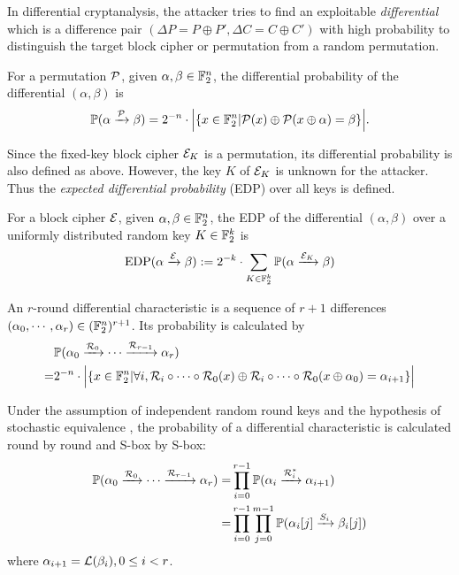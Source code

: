 In differential cryptanalysis, the attacker tries to find an exploitable \textit{differential} which is a difference pair $(\Delta P=P\oplus P',\Delta C=C\oplus C')$ with high probability to distinguish the target block cipher or permutation from a random permutation. 

\begin{definition}
    For a permutation $\mathcal{P}$, given $\alpha,\beta\in \mathbb{F}_2^n$, the differential probability of the differential $(\alpha,\beta)$ is
    \begin{align*}
        \mathbb{P}(\alpha\xrightarrow{\mathcal{P}}\beta)=2^{-n}\cdot\Big|\{x\in\mathbb{F}_2^n|\mathcal{P}(x)\oplus\mathcal{P}(x\oplus\alpha)=\beta\}\Big|.
    \end{align*}
\end{definition}

Since the fixed-key block cipher $\mathcal{E}_K$ is a permutation, its differential probability is also defined as above. However, the key $K$ of $\mathcal{E}_K$ is unknown for the attacker. Thus the \textit{expected differential probability} (EDP) over all keys is defined.

\begin{definition}
    For a block cipher $\mathcal{E}$, given $\alpha,\beta\in \mathbb{F}_2^n$, the EDP of the differential $(\alpha,\beta)$ over a uniformly distributed random key $K\in \mathbb{F}_2^k$ is 
    \begin{align*}
        \text{EDP}(\alpha\xrightarrow{\mathcal{E}}\beta):=2^{-k}\cdot\sum\limits_{K\in \mathbb{F}_2^k}\mathbb{P}(\alpha\xrightarrow{\mathcal{E}_K}\beta)
    \end{align*}
\end{definition}

\begin{definition}
    An $r$-round differential characteristic is a sequence of $r+1$ differences $(\alpha_0,\cdots,\alpha_r)\in(\mathbb{F}_2^n)^{r+1}$. Its probability is calculated by
    \begin{align*}
        &\mathbb{P}(\alpha_0\xrightarrow{\mathcal{R}_0}\cdots\xrightarrow{\mathcal{R}_{r-1}}\alpha_r)\\
        =&2^{-n}\cdot\Big|\{x\in\mathbb{F}_2^n|\forall i, \mathcal{R}_i\circ\cdots\circ\mathcal{R}_0(x)\oplus\mathcal{R}_i\circ\cdots\circ\mathcal{R}_0(x\oplus\alpha_0)=\alpha_{i+1}\}\Big|\\
    \end{align*}
\end{definition}

Under the assumption of independent random round keys and the hypothesis of stochastic equivalence \cite{lai1991markov}, the probability of a differential characteristic is calculated round by round and S-box by S-box:
\begin{align*}
    \mathbb{P}(\alpha_0\xrightarrow{\mathcal{R}_0}\cdots\xrightarrow{\mathcal{R}_{r-1}}\alpha_r)
    =&\prod\limits_{i=0}^{r-1}\mathbb{P}(\alpha_i\xrightarrow{\mathcal{R}_i^*}\alpha_{i+1})\\
    =&\prod\limits_{i=0}^{r-1}\prod\limits_{j=0}^{m-1}\mathbb{P}(\alpha_i[j]\xrightarrow{S_i}\beta_i[j])
\end{align*}
where $\alpha_{i+1}=\mathcal{L}(\beta_i),0\leq i<r$. 

